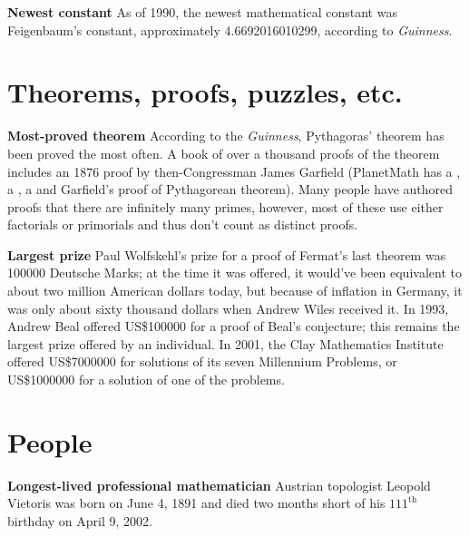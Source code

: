 \documentclass[12pt]{article}
\begin{document}
{\bf Newest constant} As of 1990, the newest mathematical constant was Feigenbaum's constant, approximately 4.6692016010299, according to {\it Guinness}.


\section{Theorems, proofs, puzzles, etc.}

{\bf Most-proved theorem} According to the {\it Guinness}, Pythagoras' theorem has been proved the most often. A book of over a thousand proofs of the theorem includes an 1876 proof by then-Congressman James Garfield (PlanetMath has a , a , a  and Garfield's proof of Pythagorean theorem). Many people have authored proofs that there are infinitely many primes, however, most of these use either factorials or primorials and thus don't count as distinct proofs.


{\bf Largest prize} Paul Wolfskehl's prize for a proof of Fermat's last theorem was 100000 Deutsche Marks; at the time it was offered, it would've been equivalent to about two million American dollars today, but because of inflation in Germany, it was only about sixty thousand dollars when Andrew Wiles received it. In 1993, Andrew Beal offered US\$100000 for a proof of Beal's conjecture; this remains the largest prize offered by an individual. In 2001, the Clay Mathematics Institute offered US\$7000000 for solutions of its seven Millennium Problems, or US\$1000000 for a solution of one of the problems.


\section{People}

{\bf Longest-lived professional mathematician} Austrian topologist Leopold Vietoris was born on June 4, 1891 and died two months short of his $111^{\mathrm{th}}$ birthday on April 9, 2002.

\end{document}

